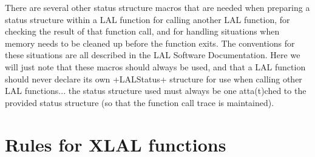 \documentclass[10pt]{ligodcc}
\makeatletter
\def\verb{\relax\ifmmode\hbox\else\leavevmode\null\fi
  \bgroup
    \color{blue}\small
    \verb@eol@error \let\do\@makeother \dospecials
    \verbatim@font\@noligs
    \@ifstar\@sverb\@verb}
\makeatother
\begin{document}
There are several other status structure macros that are needed when
preparing a status structure within a LAL function for calling another
LAL function, for checking the result of that function call, and for handling
situations when memory needs to be cleaned up before the function exits.
The conventions for these situations are all described in the LAL Software
Documentation.  Here we will just note that these macros should always be
used, and that a LAL function should never declare its own \verb+LALStatus+
structure for use when calling other LAL functions... the status structure
used must always be one atta(t)ched to the provided status structure (so that
the function call trace is maintained).


\section{Rules for XLAL functions}
\end{document}
